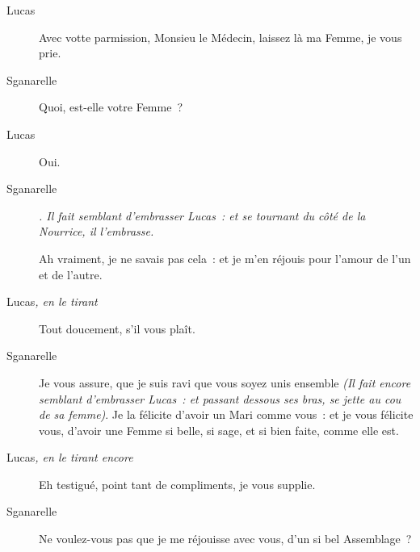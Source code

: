 \documentclass[french,twoside]{book} %
\begin{document}
 \begin{description} \item[Lucas] 

Avec votte parmission, Monsieu le Médecin, laissez là ma Femme, je vous prie.\end{description}
 \begin{description} \item[Sganarelle] 

Quoi, est-elle votre Femme ?\end{description}
 \begin{description} \item[Lucas] 

Oui.\end{description}
 \begin{description} \item[Sganarelle] \textit{. Il fait semblant d’embrasser Lucas : et se tournant du côté de la Nourrice, il l’embrasse.} 

Ah vraiment, je ne savais pas cela : et je m’en réjouis pour l’amour de l’un et de l’autre.\end{description}
 \begin{description} \item[Lucas\textit{, en le tirant}\par
] 

Tout doucement, s’il vous plaît.\end{description}
 \begin{description} \item[Sganarelle] 

Je vous assure, que je suis ravi que vous soyez unis ensemble\textit{ (Il fait encore semblant d’embrasser Lucas : et passant dessous ses bras, se jette au cou de sa femme)}. Je la félicite d’avoir un Mari comme vous : et je vous félicite vous, d’avoir une Femme si belle, si sage, et si bien faite, comme elle est.\end{description}
 \begin{description} \item[Lucas\textit{, en le tirant encore}\par
] 

Eh testigué, point tant de compliments, je vous supplie.\end{description}
 \begin{description} \item[Sganarelle] 

Ne voulez-vous pas que je me réjouisse avec vous, d’un si bel Assemblage ?\end{description}
\end{document}
